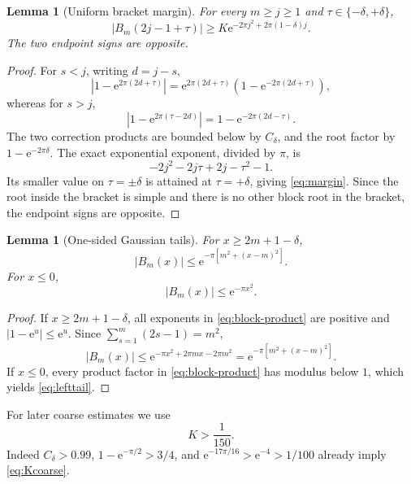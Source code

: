 \documentclass[11pt]{article}
\newtheorem{lemma}[theorem]{Lemma}
\newcommand{\e}{\mathrm{e}}
\begin{document}
\begin{lemma}[Uniform bracket margin]\label{lem:margin}
For every $m\ge j\ge1$ and $\tau\in\{-\delta,+\delta\}$,
\begin{equation}\label{eq:margin}
 |B_m(2j-1+\tau)|
 \ge K\e^{-2\pi j^2+2\pi(1-\delta)j}.
\end{equation}
The two endpoint signs are opposite.
\end{lemma}

\begin{proof}
For $s<j$, writing $d=j-s$,
\[
 |1-\e^{2\pi(2d+\tau)}|
 =\e^{2\pi(2d+\tau)}(1-\e^{-2\pi(2d+\tau)}),
\]
whereas for $s>j$,
\[
 |1-\e^{2\pi(\tau-2d)}|
 =1-\e^{-2\pi(2d-\tau)}.
\]
The two correction products are bounded below by $C_\delta$, and the root factor by $1-\e^{-2\pi\delta}$. The exact exponential exponent, divided by $\pi$, is
\[
 -2j^2-2j\tau+2j-\tau^2-1.
\]
Its smaller value on $\tau=\pm\delta$ is attained at $\tau=+\delta$, giving \eqref{eq:margin}. Since the root inside the bracket is simple and there is no other block root in the bracket, the endpoint signs are opposite.
\end{proof}

\begin{lemma}[One-sided Gaussian tails]\label{lem:tails}
For $x\ge2m+1-\delta$,
\begin{equation}\label{eq:righttail}
 |B_m(x)|\le \e^{-\pi[m^2+(x-m)^2]}.
\end{equation}
For $x\le0$,
\begin{equation}\label{eq:lefttail}
 |B_m(x)|\le \e^{-\pi x^2}.
\end{equation}
\end{lemma}

\begin{proof}
If $x\ge2m+1-\delta$, all exponents in \eqref{eq:block-product} are positive and $|1-\e^u|\le\e^u$. Since $\sum_{s=1}^{m}(2s-1)=m^2$,
\[
 |B_m(x)|\le
 \e^{-\pi x^2+2\pi mx-2\pi m^2}
 =\e^{-\pi[m^2+(x-m)^2]}.
\]
If $x\le0$, every product factor in \eqref{eq:block-product} has modulus below $1$, which yields \eqref{eq:lefttail}.
\end{proof}

For later coarse estimates we use
\begin{equation}\label{eq:Kcoarse}
 K>\frac1{150}.
\end{equation}
Indeed $C_\delta>0.99$, $1-\e^{-\pi/2}>3/4$, and $\e^{-17\pi/16}>\e^{-4}>1/100$ already imply \eqref{eq:Kcoarse}.
\end{document}
